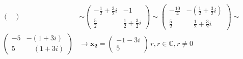 \begin{example}
\begin{align*}
\begin{pmatrix}
    \end{pmatrix}
    &\sim
    \begin{pmatrix}
      -\frac{1}{2}+\frac{3}{2}i  &  -1                                     \\
      \frac{5}{2}                & \frac{1}{2}+\frac{3}{2}i
    \end{pmatrix}
    \sim
    \begin{pmatrix}
      -\frac{10}{4}              &-\left(\frac{1}{2} +\frac{3}{2}i\right)  \\
      \frac{5}{2}                & \quad\frac{1}{2}+\frac{3}{2}i
    \end{pmatrix}
    \sim                                                                     \\
    \begin{pmatrix}
      -5                         &-\left(1+3i\right)                       \\
       5                         & \quad\left(1+3i\right)
    \end{pmatrix}
    &\rightarrow \mathbf{x_2}=
    \begin{pmatrix}
      -1-3i \\ 5
    \end{pmatrix}
    \, r, r\in\mathbb{C}, r\neq0
  \end{align*}
\end{example}

\begin{lstlisting}[caption=Výpis programu pro ověření výpočtu vlastních čísel matic programem
  Matlab.]
\end{lstlisting}
